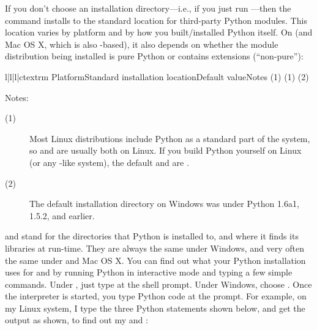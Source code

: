 \documentclass{howto}
\begin{document}
If you don't choose an installation directory---i.e., if you just run
---then the  command installs to
the standard location for third-party Python modules.  This location
varies by platform and by how you built/installed Python itself.  On
\UNIX{} (and Mac OS X, which is also \UNIX-based),
it also depends on whether the module distribution
being installed is pure Python or contains extensions (``non-pure''):
\begin{tableiv}{l|l|l|c}{textrm}%
  {Platform}{Standard installation location}{Default value}{Notes}
          {}
          {}
          {(1)}
          {}
          {}
          {(1)}
          {}
          {}
          {(2)}
\end{tableiv}

\noindent Notes:
\begin{description}
\item[(1)] Most Linux distributions include Python as a standard part of
  the system, so  and  are usually
  both  on Linux.  If you build Python yourself on Linux (or
  any \UNIX-like system), the default  and
   are .
\item[(2)] The default installation directory on Windows was
   under
  Python 1.6a1, 1.5.2, and earlier.
\end{description}

 and  stand for the directories
that Python is installed to, and where it finds its libraries at
run-time.  They are always the same under Windows, and very
often the same under \UNIX and Mac OS X.  You can find out what your Python
installation uses for  and  by
running Python in interactive mode and typing a few simple commands.
Under \UNIX, just type  at the shell prompt.  Under
Windows, choose .  
Once the interpreter is started, you type Python code at the
prompt.  For example, on my Linux system, I type the three Python
statements shown below, and get the output as shown, to find out my
 and :
\end{document}
